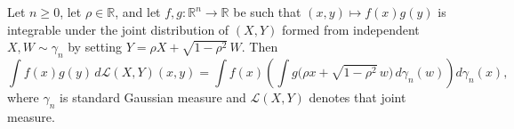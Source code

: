 \begin{lemma}
\label{BooleanAnalysis.GaussianSpace.integral_correlatedGaussianMeasure_of_integrable}
\leanok
{}
Let $n\ge0$, let $\rho\in\mathbb R$, and let $f,g:\mathbb R^n\to\mathbb R$ be such that
$(x,y)\mapsto f(x)g(y)$ is integrable under the joint distribution of $(X,Y)$ formed
from independent $X,W\sim\gamma_n$ by setting $Y=\rho X+\sqrt{1-\rho^2}\,W$. Then
\[
\int f(x)g(y)\,d\mathcal L(X,Y)(x,y)=\int f(x)\left(\int g\bigl(\rho
x+\sqrt{1-\rho^2}\,w\bigr)\,d\gamma_n(w)\right)d\gamma_n(x),
\]
where $\gamma_n$ is standard Gaussian measure and $\mathcal L(X,Y)$ denotes that joint
measure.
\end{lemma}
